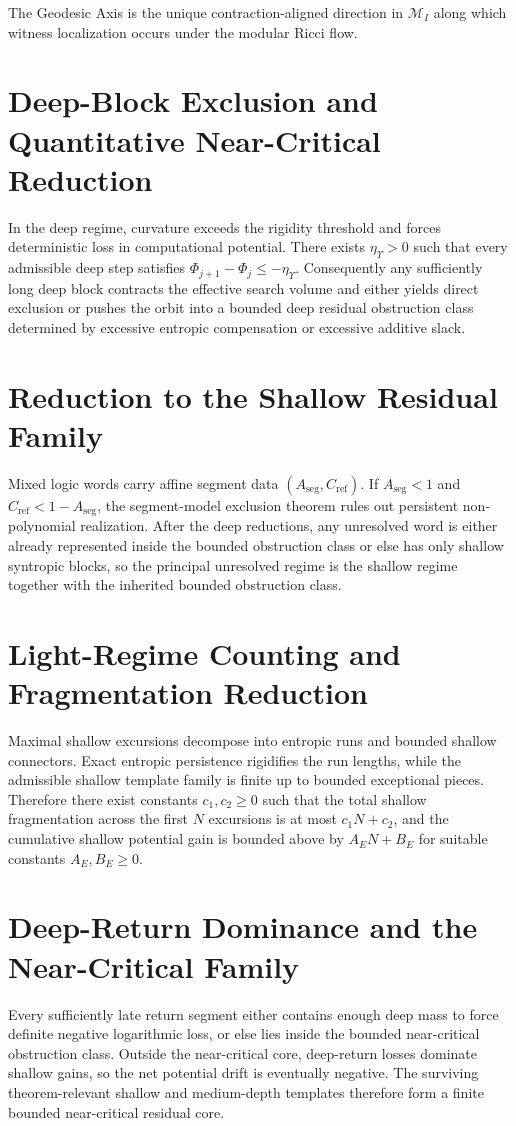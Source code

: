 \documentclass[11pt]{article}
\theoremstyle{definition}
\begin{document}
The Geodesic Axis is the unique contraction-aligned direction in $\mathcal{M}_I$ along which witness localization occurs under the modular Ricci flow.
\section{Deep-Block Exclusion and Quantitative Near-Critical Reduction}
In the deep regime, curvature exceeds the rigidity threshold and forces deterministic loss in computational potential. There exists $\eta_\Upsilon>0$ such that every admissible deep step satisfies $\Phi_{j+1}-\Phi_j\le -\eta_\Upsilon$. Consequently any sufficiently long deep block contracts the effective search volume and either yields direct exclusion or pushes the orbit into a bounded deep residual obstruction class determined by excessive entropic compensation or excessive additive slack.
\section{Reduction to the Shallow Residual Family}
Mixed logic words carry affine segment data $(A_{\mathrm{seg}},C_{\mathrm{ref}})$. If $A_{\mathrm{seg}}<1$ and $C_{\mathrm{ref}}<1-A_{\mathrm{seg}}$, the segment-model exclusion theorem rules out persistent non-polynomial realization. After the deep reductions, any unresolved word is either already represented inside the bounded obstruction class or else has only shallow syntropic blocks, so the principal unresolved regime is the shallow regime together with the inherited bounded obstruction class.
\section{Light-Regime Counting and Fragmentation Reduction}
Maximal shallow excursions decompose into entropic runs and bounded shallow connectors. Exact entropic persistence rigidifies the run lengths, while the admissible shallow template family is finite up to bounded exceptional pieces. Therefore there exist constants $c_1,c_2\ge 0$ such that the total shallow fragmentation across the first $N$ excursions is at most $c_1N+c_2$, and the cumulative shallow potential gain is bounded above by $A_EN+B_E$ for suitable constants $A_E,B_E\ge 0$.
\section{Deep-Return Dominance and the Near-Critical Family}
Every sufficiently late return segment either contains enough deep mass to force definite negative logarithmic loss, or else lies inside the bounded near-critical obstruction class. Outside the near-critical core, deep-return losses dominate shallow gains, so the net potential drift is eventually negative. The surviving theorem-relevant shallow and medium-depth templates therefore form a finite bounded near-critical residual core.
\end{document}
